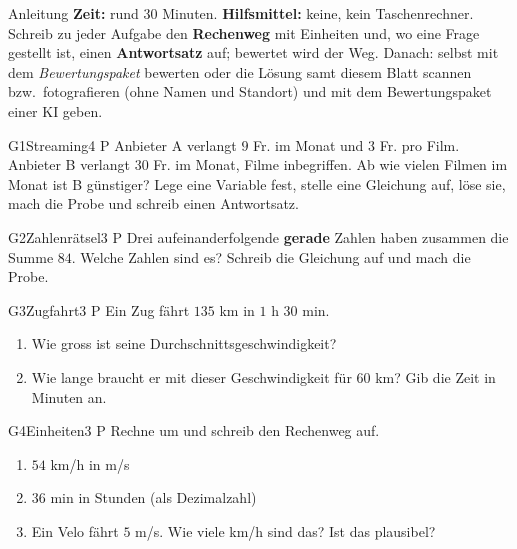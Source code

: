 \documentclass[11pt]{article}
\begin{document}

\begin{lpinfo}{Anleitung}
\textbf{Zeit:} rund 30 Minuten. \textbf{Hilfsmittel:} keine, kein Taschenrechner.
Schreib zu jeder Aufgabe den \textbf{Rechenweg} mit Einheiten und, wo eine Frage gestellt ist, einen \textbf{Antwortsatz} auf; bewertet wird der Weg.
Danach: selbst mit dem \emph{Bewertungspaket} bewerten oder die Lösung samt diesem Blatt scannen bzw.\ fotografieren
(ohne Namen und Standort) und mit dem Bewertungspaket einer KI geben.
\end{lpinfo}


\begin{lpaufgabe}{G1}{Streaming}{4 P}
Anbieter A verlangt $9$ Fr. im Monat und $3$ Fr. pro Film. Anbieter B verlangt $30$ Fr. im Monat, Filme inbegriffen.
Ab wie vielen Filmen im Monat ist B günstiger? Lege eine Variable fest, stelle eine Gleichung auf, löse sie, mach die Probe
und schreib einen Antwortsatz.
\end{lpaufgabe}

\begin{lpaufgabe}{G2}{Zahlenrätsel}{3 P}
Drei aufeinanderfolgende \textbf{gerade} Zahlen haben zusammen die Summe $84$. Welche Zahlen sind es?
Schreib die Gleichung auf und mach die Probe.
\end{lpaufgabe}


\begin{lpaufgabe}{G3}{Zugfahrt}{3 P}
Ein Zug fährt $135$ km in $1$ h $30$ min.
\begin{enumerate}[label=(\alph*),leftmargin=*,itemsep=3pt]
\item Wie gross ist seine Durchschnittsgeschwindigkeit?
\item Wie lange braucht er mit dieser Geschwindigkeit für $60$ km? Gib die Zeit in Minuten an.
\end{enumerate}
\end{lpaufgabe}

\begin{lpaufgabe}{G4}{Einheiten}{3 P}
Rechne um und schreib den Rechenweg auf.
\begin{enumerate}[label=(\alph*),leftmargin=*,itemsep=3pt]
\item $54$ km/h in m/s
\item $36$ min in Stunden (als Dezimalzahl)
\item Ein Velo fährt $5$ m/s. Wie viele km/h sind das? Ist das plausibel?
\end{enumerate}
\end{lpaufgabe}
\end{document}
